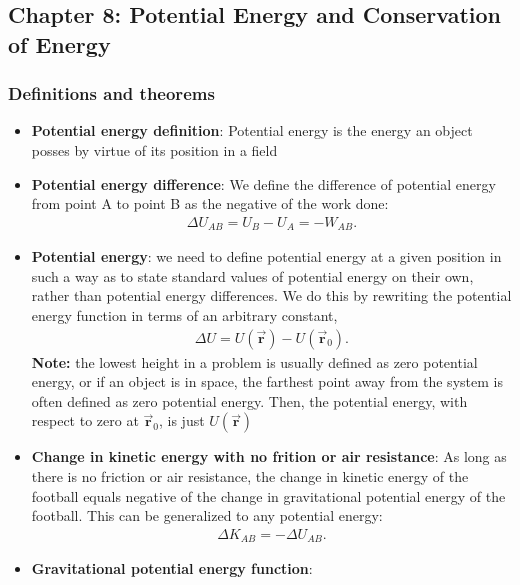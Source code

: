 \documentclass{report}
\begin{document}
    \pagebreak 
    \subsection{Chapter 8: Potential Energy and Conservation of Energy}
    \bigbreak \noindent 
    \subsubsection{Definitions and theorems}
    \begin{itemize}
        \item \textbf{Potential energy definition}: Potential energy is the energy an object posses by virtue of its position in a field
        \item \textbf{Potential energy difference}: We define the difference of potential energy from point A to point B as the negative of the work done:
            \begin{align*}
                \Delta U_{AB} = U_{B} - U_{A} = -W_{AB}
            .\end{align*}
        \item \textbf{Potential energy}: we need to define potential energy at a given position in such a way as to state standard values of potential energy on their own, rather than potential energy differences. We do this by rewriting the potential energy function in terms of an arbitrary constant,
            \begin{align*}
                \Delta U  = U(\vec{\mathbf{r}}) - U(\vec{\mathbf{r}}_{0})
            .\end{align*}
            \bigbreak \noindent 
            \textbf{Note:} the lowest height in a problem is usually defined as zero potential energy, or if an object is in space, the farthest point away from the system is often defined as zero potential energy. Then, the potential energy, with respect to zero at $\vec{\mathbf{r}}_{0}$, is just  $U(\vec{\mathbf{r}})$
        \item \textbf{Change in kinetic energy with no frition or air resistance}: As long as there is no friction or air resistance, the change in kinetic energy of the football equals negative of the change in gravitational potential energy of the football. This can be generalized to any potential energy:
            \begin{align*}
                \Delta K_{AB} = -\Delta U_{AB}
            .\end{align*}
        \item \textbf{Gravitational potential energy function}:

\end{itemize}
\end{document}
